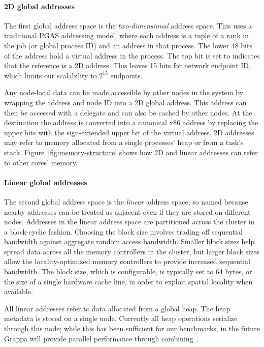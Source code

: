 \paragraph{2D global addresses} The first global address space is the {\em
two-dimensional} address space. This uses a traditional PGAS addressing model,
where each address is a tuple of a rank in the job (or global process ID) and
an address in that process. The lower 48 bits of the address hold a virtual
address in the process. The top bit is set to indicates that the reference is
a 2D address. This leaves 15 bits for network endpoint ID, which limits our
scalability to $2^{15}$ endpoints.

Any node-local data can be made accessible by other nodes in the system
by wrapping the address and node ID into a 2D global address. This
address can then be accessed with a delegate and can also be cached by
other nodes. At the destination the address is converted into a
canonical x86 address by replacing the upper bits with the sign-extended
upper bit of the virtual address. 2D addresses may refer to memory
allocated from a single processes' heap or from a task's stack.
Figure~\ref{fig:memory-structure} shows how 2D and linear addresses can
refer to other cores' memory.

\paragraph{Linear global addresses} The second global address space is
the {\em linear} address space, so named because nearby addresses can be
treated as adjacent even if they are stored on different nodes.
Addresses in the linear address space are partitioned across the cluster
in a block-cyclic fashion. Choosing the block size involves trading off
sequential bandwidth against aggregate random access bandwidth. Smaller
block sizes help spread data across all the memory controllers in the
cluster, but larger block sizes allow the locality-optimized memory
controllers to provide increased sequential bandwidth. The block size,
which is configurable, is typically set to 64 bytes, or the size of a
single hardware cache line, in order to exploit spatial locality when
available. 

All linear addresses refer to data allocated from a global heap. The
heap metadata is stored on a single node. Currently all heap operations
serialize through this node; while this has been sufficient for our
benchmarks, in the future Grappa will provide parallel performance
through combining~\cite{MAMA,flatcombining}.

